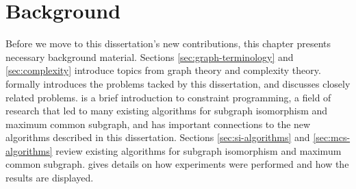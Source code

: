 \chapter{Background}
\label{c:background}

\newcommand{\FourQueens}[2] {
  \begin{tikzpicture}[scale=0.6, every node/.style={black,scale=0.9}]
    \newcommand*{\xMin}{0}%
    \newcommand*{\xMax}{3}%
    \newcommand*{\yMin}{0}%
    \newcommand*{\yMax}{3}%
    \foreach \i / \label in {0/a,1/b,2/c,3/d} {
        \draw [] node at (\i+.5,\yMin-.3) {$\label$};
    }
    \foreach \i / \label in {0/1,1/2,2/3,3/4} {
        \draw [] node at (\xMin-.3,\i+.5) {$\label$};
    }

    \foreach \y in {0,2}{
        \foreach \x in {0,2}{
            \fill[black!8] (\x,\y) rectangle (1+\x,1+\y) rectangle (2+\x,2+\y);}}
    \draw [step=1.0] (0,0) grid (4,4);
    \foreach \x/\y/\m in {#2}
        \draw [] node at (\x,\y) {\m};
    \node[draw,circle,inner sep=1mm] at (-1.4,3.5) {#1};
  \end{tikzpicture}
}

\newcommand{\MCSDomains}[2] {
  \begin{tikzpicture}[scale=0.6, every node/.style={black,scale=0.9}]
    \newcommand*{\xMin}{0}%
    \newcommand*{\xMax}{5}%
    \newcommand*{\yMin}{0}%
    \newcommand*{\yMax}{4}%
    \foreach \i / \label in {0/a,1/b,2/c,3/d,4/e,5/f} {
        \draw [] node at (\i+.5,\yMax+1.4) {$\label$};
    }
    \foreach \i / \label in {4/1,3/2,2/3,1/4,0/5} {
        \draw [] node at (\xMin-.3,\i+.5) {$\label$};
    }

    \draw [step=1.0] (0,0) grid (6,5);
    \foreach \x/\y/\m in {#2}
        \draw [] node at (\x,\y) {\m};
    \node[draw,circle,inner sep=1mm] at (-1.4,3.5) {#1};
  \end{tikzpicture}
}

Before we move to this dissertation's new contributions, this chapter presents
necessary background material.  Sections \ref{sec:graph-terminology} and
\ref{sec:complexity} introduce topics from graph theory and complexity theory.
 formally introduces the problems tacked by this
dissertation, and  discusses closely related
problems.   is a brief introduction to constraint programming, a
field of research that led to many existing algorithms for subgraph isomorphism
and maximum common subgraph, and has important connections to the new
algorithms described in this dissertation.  Sections \ref{sec:si-algorithms}
and \ref{sec:mcs-algorithms} review existing algorithms for subgraph
isomorphism and maximum common subgraph.   gives
details on how experiments were performed and how the results are displayed.

